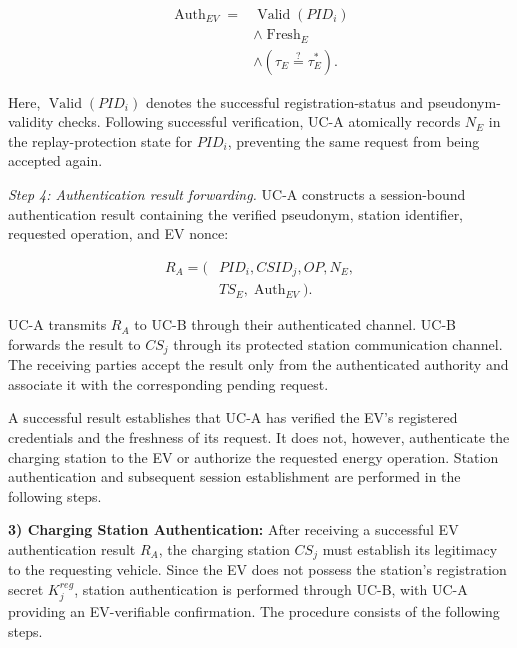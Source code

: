 \documentclass[twocolumn,10pt,journal]{IEEEtran}
\begin{document}
\begin{equation}
\begin{aligned}
\operatorname{Auth}_{EV}
={}&\operatorname{Valid}(PID_i)
\\
&\land\operatorname{Fresh}_{E}
\\
&\land
(\tau_E\stackrel{?}{=}\tau_E^{*}).
\end{aligned}
\label{eq:ev_auth_decision}
\end{equation}

Here, $\operatorname{Valid}(PID_i)$ denotes
the successful registration-status and
pseudonym-validity checks. Following successful
verification, UC-A atomically records $N_E$
in the replay-protection state for $PID_i$,
preventing the same request from being accepted
again.

\textit{Step 4: Authentication result forwarding.}
UC-A constructs a session-bound authentication
result containing the verified pseudonym,
station identifier, requested operation, and
EV nonce:

\begin{equation}
\begin{aligned}
R_A = (&PID_i,CSID_j,OP,N_E,\\
       &TS_E,\operatorname{Auth}_{EV}).
\end{aligned}
\label{eq:ev_auth_result}
\end{equation}

UC-A transmits $R_A$ to UC-B through their
authenticated channel. UC-B forwards the result
to $CS_j$ through its protected station
communication channel. The receiving parties
accept the result only from the authenticated
authority and associate it with the corresponding
pending request.

A successful result establishes that UC-A has
verified the EV's registered credentials and
the freshness of its request. It does not,
however, authenticate the charging station
to the EV or authorize the requested energy
operation. Station authentication and subsequent
session establishment are performed in the
following steps.

\noindent\textbf{3) Charging Station Authentication:}
After receiving a successful EV authentication result
$R_A$, the charging station $CS_j$ must establish its
legitimacy to the requesting vehicle. Since the EV
does not possess the station's registration secret
$K_j^{reg}$, station authentication is performed
through UC-B, with UC-A providing an EV-verifiable
confirmation. The procedure consists of the
following steps.
\end{document}
